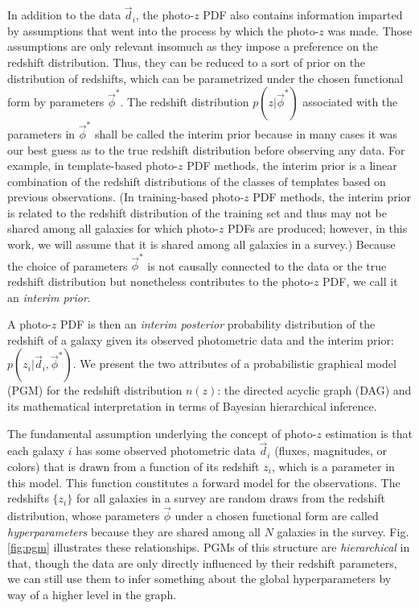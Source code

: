 \documentclass[iop]{emulateapj}
\begin{document}
In addition to the data $\vec{d}_{i}$, the photo-$z$ PDF also contains information imparted by assumptions that went into the process by which the photo-$z$ was made.  Those assumptions are only relevant insomuch as they impose a preference on the redshift distribution. Thus, they can be reduced to a sort of prior on the distribution of redshifts, which can be parametrized under the chosen functional form by parameters $\vec{\phi}^{*}$.  The redshift distribution $p(z | \vec{\phi}^{*})$ associated with the parameters in $\vec{\phi}^{*}$ shall be called the interim prior because in many cases it was our best guess as to the true redshift distribution before observing any data.  For example, in template-based photo-$z$ PDF methods, the interim prior is a linear combination of the redshift distributions of the classes of templates based on previous observations.  (In training-based photo-$z$ PDF methods, the interim prior is related to the redshift distribution of the training set and thus may not be shared among all galaxies for which photo-$z$ PDFs are produced; however, in this work, we will assume that it is shared among all galaxies in a survey.)  Because the choice of parameters $\vec{\phi}^{*}$ is not causally connected to the data or the true redshift distribution but nonetheless contributes to the photo-$z$ PDF, we call it an \textit{interim prior}.  

A photo-$z$ PDF is then an \textit{interim posterior} probability distribution of the redshift of a galaxy given its observed photometric data and the interim prior: $p(z_{i} | \vec{d}_{i}, \vec{\phi}^{*})$.  
We present the two attributes of a probabilistic graphical model (PGM) for the redshift distribution $n(z)$: the directed acyclic graph (DAG) and its mathematical interpretation in terms of Bayesian hierarchical inference.  

The fundamental assumption underlying the concept of photo-$z$ estimation is that each galaxy $i$ has some observed photometric data $\vec{d}_{i}$ (fluxes, magnitudes, or colors) that is drawn from a function of its redshift $z_{i}$, which is a parameter in this model.  This function constitutes a forward model for the observations.  The redshifts $\{z_{i}\}$ for all galaxies in a survey are random draws from the redshift distribution, whose parameters  $\vec{\phi}$ under a chosen functional form are called \textit{hyperparameters} because they are shared among all $N$ galaxies in the survey.  Fig. \ref{fig:pgm} illustrates these relationships.  PGMs of this structure are \textit{hierarchical} in that, though the data are only directly influenced by their redshift parameters, we can still use them to infer something about the global hyperparameters by way of a higher level in the graph.
\end{document}
